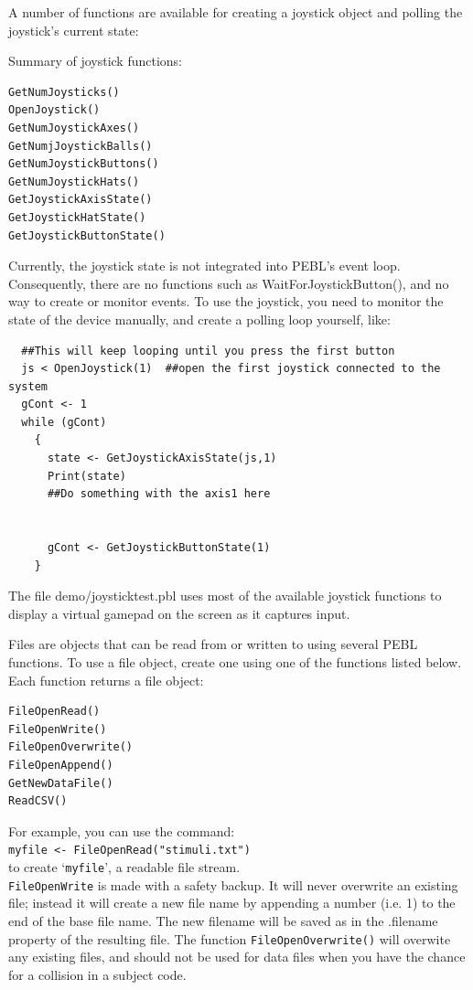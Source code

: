 A number of functions are available for creating a joystick object and polling the joystick's current state:


Summary of joystick functions:
\begin{verbatim}
GetNumJoysticks()
OpenJoystick()
GetNumJoystickAxes()
GetNumjJoystickBalls()
GetNumJoystickButtons()
GetNumJoystickHats()
GetJoystickAxisState()
GetJoystickHatState()
GetJoystickButtonState()
\end{verbatim}

Currently, the joystick state is not integrated into PEBL's event loop.  Consequently, there are no functions such as WaitForJoystickButton(), and no way to create or monitor events.  To use the joystick, you need to monitor the state of the device manually, and create a polling loop yourself, like:


\begin{verbatim}
  ##This will keep looping until you press the first button
  js < OpenJoystick(1)  ##open the first joystick connected to the system  
  gCont <- 1
  while (gCont)
    {
      state <- GetJoystickAxisState(js,1)
      Print(state)
      ##Do something with the axis1 here
      
      
      gCont <- GetJoystickButtonState(1)
    }
\end{verbatim}


The file demo/joysticktest.pbl uses most of the available joystick functions to display a virtual gamepad on the screen as it captures input.


Files are objects that can be read from or written to using several PEBL functions. To use a file object, create one using one of the functions 
listed below.  Each function returns a file object:
\begin{verbatim}
FileOpenRead()
FileOpenWrite()
FileOpenOverwrite()
FileOpenAppend()
GetNewDataFile()
ReadCSV()
\end{verbatim}

For example, you can use the command:\\
 \texttt{myfile <-  FileOpenRead("stimuli.txt")} \\
to create `\texttt{myfile}', a readable file stream.\\


\texttt{FileOpenWrite} is made with a safety backup.  It will never overwrite an existing file; instead it will create a new file name by appending a number (i.e. 1) to the end of the base file name.  The new filename will be saved as in the .filename property of the resulting file.  The function \texttt{FileOpenOverwrite()} will overwite any existing files, and should not be used for data files when you have the chance for a collision in a subject code.




